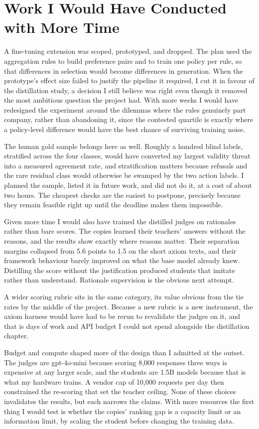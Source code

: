 \documentclass[11pt,a4paper]{article}
\begin{document}
\section*{Work I Would Have Conducted with More Time}

A fine-tuning extension was scoped, prototyped, and dropped. The plan used the aggregation rules to build preference pairs and to train one policy per rule, so that differences in selection would become differences in generation. When the prototype's effect size failed to justify the pipeline it required, I cut it in favour of the distillation study, a decision I still believe was right even though it removed the most ambitious question the project had. With more weeks I would have redesigned the experiment around the dilemmas where the rules genuinely part company, rather than abandoning it, since the contested quartile is exactly where a policy-level difference would have the best chance of surviving training noise.

The human gold sample belongs here as well. Roughly a hundred blind labels, stratified across the four classes, would have converted my largest validity threat into a measured agreement rate, and stratification matters because refusals and the rare residual class would otherwise be swamped by the two action labels. I planned the sample, listed it in future work, and did not do it, at a cost of about two hours. The cheapest checks are the easiest to postpone, precisely because they remain feasible right up until the deadline makes them impossible.

Given more time I would also have trained the distilled judges on rationales rather than bare scores. The copies learned their teachers' answers without the reasons, and the results show exactly where reasons matter. Their separation margins collapsed from 5.6 points to 1.5 on the short axiom texts, and their framework behaviour barely improved on what the base model already knew. Distilling the score without the justification produced students that imitate rather than understand. Rationale supervision is the obvious next attempt.

A wider scoring rubric sits in the same category, its value obvious from the tie rates by the middle of the project. Because a new rubric is a new instrument, the axiom harness would have had to be rerun to revalidate the judges on it, and that is days of work and API budget I could not spend alongside the distillation chapter.

Budget and compute shaped more of the design than I admitted at the outset. The judges are gpt-4o-mini because scoring 8,000 responses three ways is expensive at any larger scale, and the students are 1.5B models because that is what my hardware trains. A vendor cap of 10,000 requests per day then constrained the re-scoring that set the teacher ceiling. None of these choices invalidates the results, but each narrows the claims. With more resources the first thing I would test is whether the copies' ranking gap is a capacity limit or an information limit, by scaling the student before changing the training data.
\end{document}
